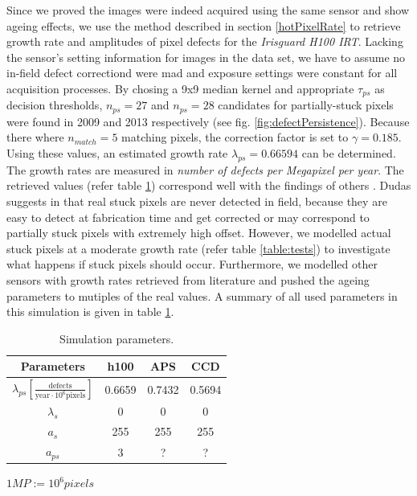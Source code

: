 \documentclass[10pt,twocolumn,letterpaper]{article}
\begin{document}
\vspace{-4mm}

Since we proved the images were indeed acquired using the same sensor and show ageing effects, we use the method described in section \ref{hotPixelRate} to retrieve growth rate and amplitudes of pixel defects for the \emph{Irisguard H100 IRT}. Lacking the sensor's setting information for images in the data set, we have to assume no in-field defect correctiond \cite{inFieldDefects} were mad and exposure settings were constant for all acquisition processes. By chosing a 9x9 median kernel and appropriate $\tau_{ps}$ as decision thresholds, $n_{ps}=27$ and $n_{ps}=28$ candidates for partially-stuck pixels were found in 2009 and 2013 respectively (see fig. \ref{fig:defectPersistence}). Because there where $n_{match}=5$ matching pixels, the correction factor is set to $\gamma=0.185$. Using these values, an estimated growth rate $\lambda_{ps}=0.66594$ can be determined. The growth rates are measured in \emph{number of defects per Megapixel per year}. The retrieved values (refer table \ref{table:parameters}) correspond well with the findings of others \cite{defectDetection, leung}. Dudas suggests in \cite{inFieldDefects} that real stuck pixels are never detected in field, because they are easy to detect at fabrication time and get corrected or may correspond to partially stuck pixels with extremely high offset. However, we modelled actual stuck pixels at a moderate growth rate (refer table \ref{table:tests}) to investigate what happens if stuck pixels should occur. Furthermore, we modelled other sensors with growth rates retrieved from literature and pushed the ageing parameters to mutiples of the real values. A summary of all used parameters in this simulation is given in table \ref{table:parameters}.


 \bgroup
\def\arraystretch{1.3}%
 \begin{table} [hbt]
  \begin{center}
    \begin{tabular}{|c | c c c|}
    \hline 
    \textbf{Parameters} & h100  & APS \cite{leung} & CCD \cite{leung} \\
    \hline 
    $\lambda_{ps} [\frac{\text{defects}}{\text{year} \cdot 10^6 \text{pixels}}]$  & 0.6659 &  0.7432 & 0.5694 \\
    $\lambda_s$ 	&  0  & 0 & 0 \\
    $a_s$		&  255  & 255 & 255 \\
    $a_{ps}$	&  3  & ? & ? \\
    \hline  
    \end{tabular}

    \vspace{1mm}
    \hfill \tiny { $1MP := 10^6 pixels$}
     \vspace{-2mm}
    
    \caption{Simulation parameters. }
    \label{table:parameters}
  \end{center}
  \vspace{-5mm}
\end{table}
\end{document}
